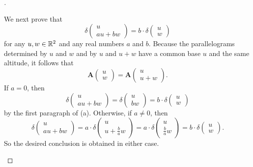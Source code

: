 \begin{proof}[]
\begin{enumerate}
		      We next prove that
		      \[
			      \delta\begin{pmatrix}
				      u \\
				      au + bw
			      \end{pmatrix} = b \cdot \delta\begin{pmatrix}
				      u \\
				      w
			      \end{pmatrix}
		      \]
		      for any \(u, w \in \mathbb{R}^2\) and any real numbers \(a\) and \(b\).
		      Because the parallelograms determined by \(u\) and \(w\) and by \(u\) and \(u + w\) have a common base \(u\) and the same altitude, it follows that
		      \[
			      \mathbf{A}\begin{pmatrix}
				      u \\
				      w
			      \end{pmatrix} = \mathbf{A}\begin{pmatrix}
				      u \\
				      u + w
			      \end{pmatrix}.
		      \]
		      If \(a = 0\), then
		      \[
			      \delta\begin{pmatrix}
				      u \\
				      au + bw
			      \end{pmatrix} = \delta\begin{pmatrix}
				      u \\
				      bw
			      \end{pmatrix} = b \cdot \delta\begin{pmatrix}
				      u \\
				      w
			      \end{pmatrix}
		      \]
		      by the first paragraph of (a).
		      Otherwise, if \(a \neq 0\), then
		      \[
			      \delta\begin{pmatrix}
				      u \\
				      au + bw
			      \end{pmatrix} = a \cdot \delta\begin{pmatrix}
				      u \\
				      u + \frac{b}{a} w
			      \end{pmatrix} = a \cdot \delta\begin{pmatrix}
				      u \\
				      \frac{b}{a} w
			      \end{pmatrix} = b \cdot \delta\begin{pmatrix}
				      u \\
				      w
			      \end{pmatrix}.
		      \]
		      So the desired conclusion is obtained in either case.


\end{enumerate}
\end{proof}

